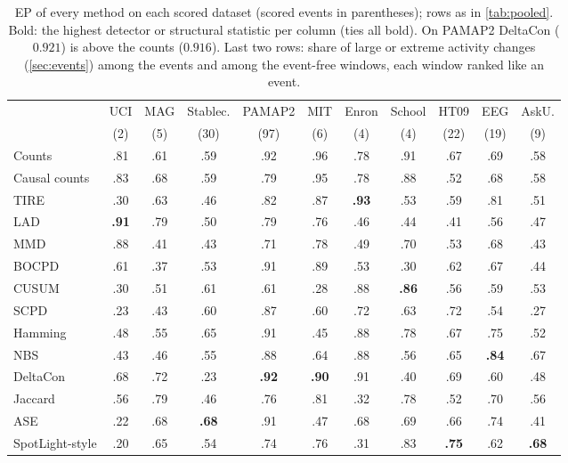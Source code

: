 \documentclass[11pt]{article}
\let\dsmidrule\midrule
\renewcommand{\midrule}{\arrayrulecolor{dsrule}\dsmidrule\arrayrulecolor{dsnavy}}
\theoremstyle{dsplain}
\theoremstyle{definition}
\begin{document}
\begin{table}[!t]
  \begin{minipage}[t]{0.6\textwidth}
  \centering\captionsetup{justification=raggedright,singlelinecheck=false}
  \caption{EP of every method on each scored dataset (scored events in parentheses); rows as in
  \cref{tab:pooled}. Bold: the highest detector or structural statistic per column (ties all bold). On
  PAMAP2 DeltaCon ($0.921$) is above the counts ($0.916$). Last two rows: share of large or extreme
  activity changes (\cref{sec:events}) among the events and among the event-free windows, each window
  ranked like an event.}
  \label{tab:perds}
  \scriptsize
  \setlength{\tabcolsep}{0.9pt}
  \begin{tabular}{lcccccccccc}
    \toprule
    & UCI & MAG & Stablec. & PAMAP2 & MIT & Enron & School & HT09 & EEG & AskU. \\
    & (2) & (5) & (30) & (97) & (6) & (4) & (4) & (22) & (19) & (9) \\
    \midrule
    Counts & .81 & .61 & .59 & .92 & .96 & .78 & .91 & .67 & .69 & .58 \\
    Causal counts & .83 & .68 & .59 & .79 & .95 & .78 & .88 & .52 & .68 & .58 \\
    \midrule
    TIRE & .30 & .63 & .46 & .82 & .87 & \textbf{.93} & .53 & .59 & .81 & .51 \\
    LAD & \textbf{.91} & .79 & .50 & .79 & .76 & .46 & .44 & .41 & .56 & .47 \\
    MMD & .88 & .41 & .43 & .71 & .78 & .49 & .70 & .53 & .68 & .43 \\
    BOCPD & .61 & .37 & .53 & .91 & .89 & .53 & .30 & .62 & .67 & .44 \\
    CUSUM & .30 & .51 & .61 & .61 & .28 & .88 & \textbf{.86} & .56 & .59 & .53 \\
    SCPD & .23 & .43 & .60 & .87 & .60 & .72 & .63 & .72 & .54 & .27 \\
    \midrule
    Hamming & .48 & .55 & .65 & .91 & .45 & .88 & .78 & .67 & .75 & .52 \\
    NBS & .43 & .46 & .55 & .88 & .64 & .88 & .56 & .65 & \textbf{.84} & .67 \\
    DeltaCon & .68 & .72 & .23 & \textbf{.92} & \textbf{.90} & .91 & .40 & .69 & .60 & .48 \\
    Jaccard & .56 & .79 & .46 & .76 & .81 & .32 & .78 & .52 & .70 & .56 \\
    ASE & .22 & .68 & \textbf{.68} & .91 & .47 & .68 & .69 & .66 & .74 & .41 \\
    SpotLight-style & .20 & .65 & .54 & .74 & .76 & .31 & .83 & \textbf{.75} & .62 & \textbf{.68} \\

\end{tabular}
\end{minipage}
\end{table}
\end{document}

